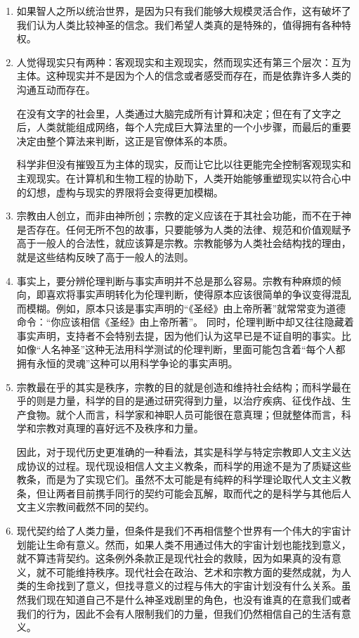 \documentclass[UTF8]{ctexart}
\begin{document}
\begin{enumerate}
			\item 如果智人之所以统治世界，是因为只有我们能够大规模灵活合作，这有破坏了我们认为人类比较神圣的信念。我们希望人类真的是特殊的，值得拥有各种特权。
			
			\item  人觉得现实只有两种：客观现实和主观现实，然而现实还有第三个层次：互为主体。这种现实并不是因为个人的信念或者感受而存在，而是依靠许多人类的沟通互动而存在。
			
			在没有文字的社会里，人类通过大脑完成所有计算和决定；但在有了文字之后，人类就能组成网络，每个人完成巨大算法里的一个小步骤，而最后的重要决定由整个算法来判断，这正是官僚体系的本质。
			
			科学非但没有摧毁互为主体的现实，反而让它比以往更能完全控制客观现实和主观现实。在计算机和生物工程的协助下，人类开始能够重塑现实以符合心中的幻想，虚构与现实的界限将会变得更加模糊。
			
			\item 宗教由人创立，而非由神所创；宗教的定义应该在于其社会功能，而不在于神是否存在。任何无所不包的故事，只要能够为人类的法律、规范和价值观赋予高于一般人的合法性，就应该算是宗教。宗教能够为人类社会结构找的理由，就是这些结构反映了高于一般人的法则。
			
			\item 事实上，要分辨伦理判断与事实声明并不总是那么容易。宗教有种麻烦的倾向，即喜欢将事实声明转化为伦理判断，使得原本应该很简单的争议变得混乱而模糊。例如，原本只该是事实声明的“《圣经》由上帝所著”就常常变为道德命令：“你应该相信《圣经》由上帝所著”。 同时，伦理判断中却又往往隐藏着事实声明，支持者不会特别去提，因为他们认为这早已是不证自明的事实。比如像“人名神圣”这种无法用科学测试的伦理判断，里面可能包含着“每个人都拥有永恒的灵魂”这种可以用科学争论的事实声明。
			
			\item  宗教最在乎的其实是秩序，宗教的目的就是创造和维持社会结构；而科学最在乎的则是力量，科学的目的是通过研究得到力量，以治疗疾病、征伐作战、生产食物。就个人而言，科学家和神职人员可能很在意真理；但就整体而言，科学和宗教对真理的喜好远不及秩序和力量。
			
			因此，对于现代历史更准确的一种看法，其实是科学与特定宗教即人文主义达成协议的过程。现代现设相信人文主义教条，而科学的用途不是为了质疑这些教条，而是为了实现它们。虽然不太可能是有纯粹的科学理论取代人文主义教条，但让两者目前携手同行的契约可能会瓦解，取而代之的是科学与其他后人文主义宗教间截然不同的契约。
			
			\item  现代契约给了人类力量，但条件是我们不再相信整个世界有一个伟大的宇宙计划能让生命有意义。然而，如果人类不用通过伟大的宇宙计划也能找到意义，就不算违背契约。这条例外条款正是现代社会的救赎，因为如果真的没有意义，就不可能维持秩序。现代社会在政治、艺术和宗教方面的斐然成就，为人类的生命找到了意义，但找寻意义的过程与伟大的宇宙计划没有什么关系。虽然我们现在知道自己不是什么神圣戏剧里的角色，也没有谁真的在意我们或者我们的行为，因此不会有人限制我们的力量，但我们仍然相信自己的生活有意义。
			

\end{enumerate}
\end{document}

